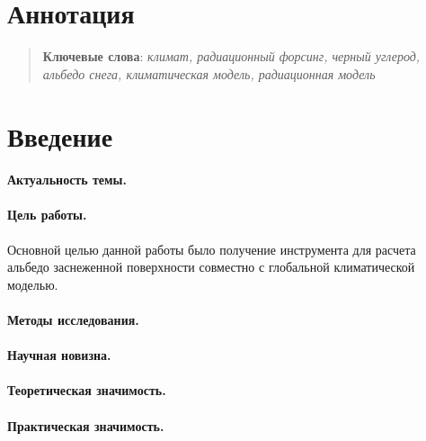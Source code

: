 \documentclass[a4paper, fontsize=14pt]{scrartcl}
\begin{document}
\section*{Аннотация}
\begin{abstract}
 

  \bigskip
  \textbf{Ключевые слова}: \emph{климат, радиационный форсинг, черный углерод, альбедо снега, климатическая модель, радиационная модель}
\end{abstract}


\newpage
{}
{}
\tableofcontents


\newpage
\section*{Введение}

\paragraph{Актуальность темы.}


\paragraph{Цель работы.}

Основной целью данной работы было получение инструмента для расчета альбедо заснеженной поверхности совместно с глобальной климатической моделью.

\paragraph{Методы исследования.}


\paragraph{Научная новизна.}


\paragraph{Теоретическая значимость.}


\paragraph{Практическая значимость.}
\end{document}
